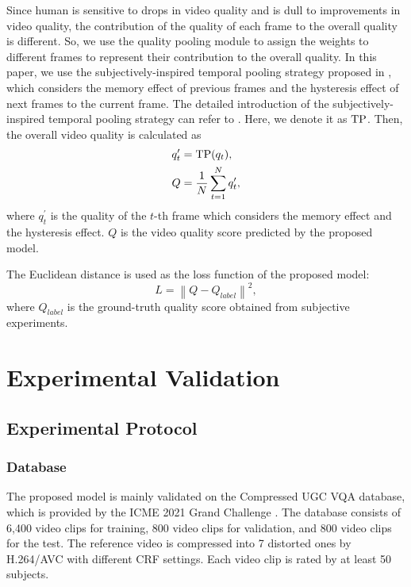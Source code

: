 \documentclass{article}
\begin{document}
Since human is sensitive to drops in video quality and is dull to improvements in video quality, the contribution of the quality of each frame to the overall quality is different. So, we use the quality pooling module to assign the weights to different frames to represent their contribution to the overall quality. In this paper, we use the subjectively-inspired temporal pooling strategy proposed in \cite{li2019quality}, which considers the memory effect of previous frames and the hysteresis effect of next frames to the current frame. The detailed introduction of the subjectively-inspired temporal pooling strategy can refer to \cite{li2019quality}. Here, we denote it as $\rm TP$.
Then, the overall video quality is calculated as
\begin{equation}
\begin{aligned}
q_{t}^{\prime}  &= {\rm TP}(q_t), \\
Q  &= \frac{1}{N} \sum_{t=1}^{N} q_{t}^{\prime}, \\
\end{aligned}
\end{equation}
where $q_{t}^{\prime}$ is the quality of the $t$-th frame which considers the memory effect and the hysteresis effect. $Q$ is the video quality score predicted by the proposed model.

The Euclidean distance is used as the loss function of the proposed model:
\begin{equation}
L=\left\|Q-Q_{label} \right\|^{2},
\end{equation}
where $Q_{label}$ is the ground-truth quality score obtained from subjective experiments.

\section{Experimental Validation}


\subsection{Experimental Protocol}
\subsubsection{Database}
The proposed model is mainly validated on the Compressed UGC VQA database, which is provided by the ICME 2021 Grand Challenge \cite{ugc2021challenge}. The database consists of 6,400 video clips for training, 800 video clips for validation, and 800 video clips for the test. The reference video is compressed into 7 distorted ones by H.264/AVC with different CRF settings. Each video clip is rated by at least 50 subjects.
\end{document}
